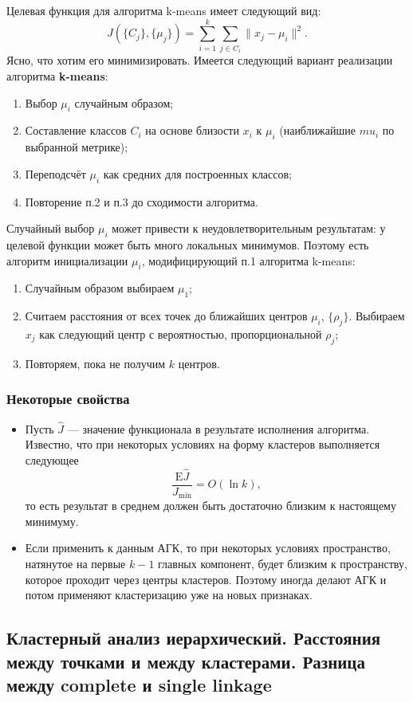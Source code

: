 \documentclass[12pt,a4paper,final]{article}
\newcommand{\E}{\mathrm{E}}
\newcommand{\1}{\mathds{1}}
\begin{document}
Целевая функция для алгоритма k-means имеет следующий вид:
$$
J(\{C_j\},\{\mu_j\}) =\sum_{i = 1}^k \sum_{j \in C_i} \|x_j - \mu_i\|^2.
$$
Ясно, что хотим его минимизировать.  Имеется следующий вариант реализации алгоритма \textbf{k-means}:
\begin{enumerate}
\item Выбор $\mu_i$ случайным образом;
\item Составление классов $C_i$ на основе близости $x_i$ к $\mu_i$ (наиближайшие $mu_i$ по выбранной метрике);
\item Переподсчёт $\mu_i$ как средних для построенных классов;
\item Повторение п.2 и п.3 до сходимости алгоритма.
\end{enumerate}
Случайный выбор $\mu_i$ может привести к неудовлетворительным результатам: у целевой функции может быть много локальных минимумов. Поэтому есть алгоритм инициализации $\mu_i$, модифицирующий п.1 алгоритма k-means:
\begin{enumerate}
\item Случайным образом выбираем $\mu_1$;
\item Считаем расстояния от всех точек до ближайших центров $\mu_i$, $\{\rho_j\}$. Выбираем $x_j$ как следующий центр с вероятностью, пропорциональной $\rho_j$;
\item Повторяем, пока не получим $k$ центров.
\end{enumerate}

\subsubsection*{Некоторые свойства}
\begin{itemize}
\item Пусть $\hat J$ --- значение функционала в результате исполнения алгоритма. Известно, что при некоторых условиях на форму кластеров выполняется следующее
$$
\frac{\E \hat{J}}{J_{\text{min}}} = O(\ln k),
$$
то есть результат в среднем должен быть достаточно близким к настоящему минимуму.
\item Если применить к данным АГК, то при некоторых условиях пространство, натянутое на первые $k-1$ главных компонент, будет близким к пространству, которое проходит через центры кластеров. Поэтому иногда делают АГК и потом применяют кластеризацию уже на новых признаках.
\end{itemize}

\subsection{Кластерный анализ иерархический. Расстояния между точками и между кластерами. Разница между complete и single linkage}
 
\end{document}
